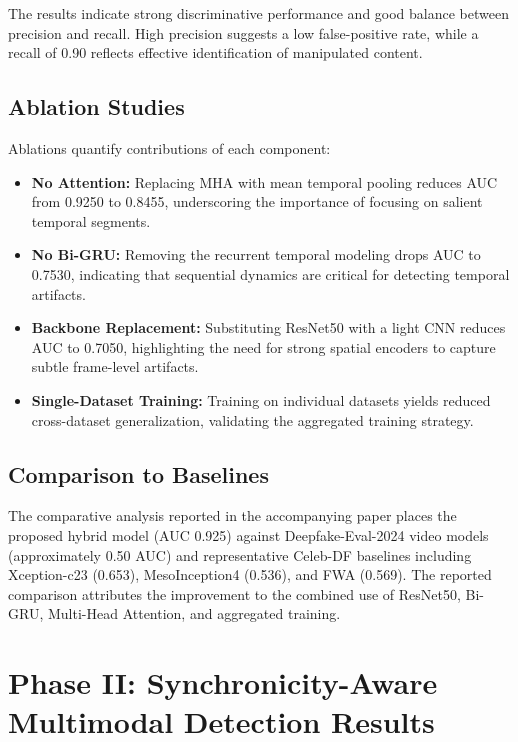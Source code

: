 The results indicate strong discriminative performance and good balance between precision and recall. High precision suggests a low false-positive rate, while a recall of 0.90 reflects effective identification of manipulated content.

\subsection{Ablation Studies}
Ablations quantify contributions of each component:
\begin{itemize}
    \item \textbf{No Attention:} Replacing MHA with mean temporal pooling reduces AUC from 0.9250 to 0.8455, underscoring the importance of focusing on salient temporal segments.
    \item \textbf{No Bi-GRU:} Removing the recurrent temporal modeling drops AUC to 0.7530, indicating that sequential dynamics are critical for detecting temporal artifacts.
    \item \textbf{Backbone Replacement:} Substituting ResNet50 with a light CNN reduces AUC to 0.7050, highlighting the need for strong spatial encoders to capture subtle frame-level artifacts.
    \item \textbf{Single-Dataset Training:} Training on individual datasets yields reduced cross-dataset generalization, validating the aggregated training strategy.
\end{itemize}

\subsection{Comparison to Baselines}
The comparative analysis reported in the accompanying paper places the proposed hybrid model (AUC 0.925) against Deepfake-Eval-2024 video models (approximately 0.50 AUC) and representative Celeb-DF baselines including Xception-c23 (0.653), MesoInception4 (0.536), and FWA (0.569). The reported comparison attributes the improvement to the combined use of ResNet50, Bi-GRU, Multi-Head Attention, and aggregated training.

\section{Phase II: Synchronicity-Aware Multimodal Detection Results}
